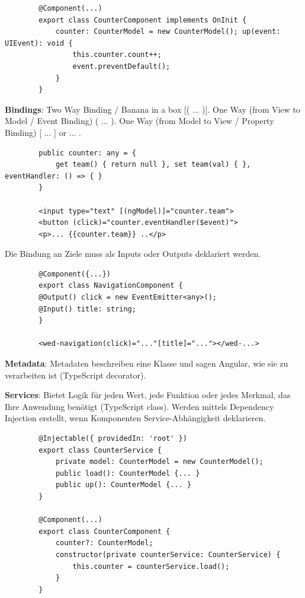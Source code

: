 \documentclass[10pt,landscape]{article}
\begin{document}
\begin{multicols}{3}
\begin{lstlisting}
        @Component(...)
        export class CounterComponent implements OnInit {
            counter: CounterModel = new CounterModel(); up(event: UIEvent): void {
                this.counter.count++;
                event.preventDefault();
            }
        }
        \end{lstlisting}

        \textbf{Bindings}: Two Way Binding / Banana in a box [( ... )].
        One Way (from View to Model / Event Binding) ( ... ).
        One Way (from Model to View / Property Binding) [ ... ] or {{ ... }}.

        \begin{lstlisting}
        public counter: any = {
            get team() { return null }, set team(val) { }, eventHandler: () => { }
        }

        <input type="text" [(ngModel)]="counter.team">
        <button (click)="counter.eventHandler($event)">
        <p>... {{counter.team}} ..</p>
        \end{lstlisting}

        Die Bindung an Ziele muss als Inputs oder Outputs deklariert werden.

        \begin{lstlisting}
        @Component({...})
        export class NavigationComponent {
        @Output() click = new EventEmitter<any>();
        @Input() title: string;
        }

        <wed-navigation(click)="..."[title]="..."></wed-...>
        \end{lstlisting}

        \textbf{Metadata}: Metadaten beschreiben eine Klasse und sagen Angular, wie sie zu verarbeiten ist (TypeScript decorator).

        \textbf{Services}: Bietet Logik für jeden Wert, jede Funktion oder jedes Merkmal, das Ihre Anwendung benötigt (TypeScript class).
        Werden mittels Dependency Injection erstellt, wenn Komponenten Service-Abhängigkeit deklarieren.

        \begin{lstlisting}
        @Injectable({ providedIn: 'root' })
        export class CounterService {
            private model: CounterModel = new CounterModel();
            public load(): CounterModel {... }
            public up(): CounterModel {... }
        }

        @Component(...)
        export class CounterComponent {
            counter?: CounterModel;
            constructor(private counterService: CounterService) {
                this.counter = counterService.load();
            }
        }
        \end{lstlisting}


\end{multicols}
\end{document}
